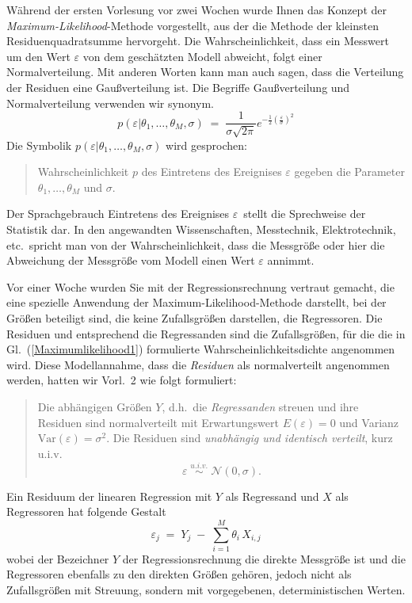 Während der ersten Vorlesung vor zwei Wochen wurde Ihnen das Konzept der
\textsl{Maximum-Likelihood}-Methode vorgestellt, aus
der die Methode der kleinsten Residuenquadratsumme hervorgeht. Die Wahrscheinlichkeit,
dass ein Messwert um den Wert $\varepsilon$ von dem geschätzten Modell abweicht, folgt
einer Normalverteilung. Mit anderen Worten kann man auch sagen, dass
die Verteilung der Residuen eine Gaußverteilung ist.
Die Begriffe Gaußverteilung und Normalverteilung verwenden wir synonym.
\begin{equation}
p(\varepsilon | \theta_1,\dots,\theta_M, \sigma) \; = \; \frac{1}{\sigma \sqrt{2 \pi}}
e^{-\frac{1}{2} \left(\frac{\varepsilon}{\sigma}\right)^2}
\label{Maximumlikelihood1}
\end{equation}
Die Symbolik $p(\varepsilon | \theta_1,\dots,\theta_M, \sigma)$ wird gesprochen:
\begin{quote}
Wahrscheinlichkeit $p$ des Eintretens des Ereignises $\varepsilon$
gegeben die Parameter $\theta_1,\dots,\theta_M$ und $\sigma$.
\end{quote}
Der Sprachgebrauch \glqq Eintretens des Ereignises $\varepsilon$\grqq ~stellt die
Sprechweise der Statistik dar. In den angewandten Wissenschaften, Messtechnik,
Elektrotechnik, etc.\ spricht man von der Wahrscheinlichkeit, dass die Messgröße
oder hier die Abweichung der Messgröße vom Modell einen Wert $\varepsilon$ annimmt.

Vor einer Woche wurden Sie mit der Regressionsrechnung vertraut gemacht, die
eine spezielle Anwendung der Maximum-Likelihood-Methode darstellt, bei der
Größen beteiligt sind, die keine Zufallsgrößen darstellen, die Regressoren.
Die Residuen und entsprechend die Regressanden sind die Zufallsgrößen,
für die die in Gl.~(\ref{Maximumlikelihood1}) formulierte Wahrscheinlichkeitsdichte
angenommen wird.
Diese Modellannahme, dass die \textsl{Residuen} als normalverteilt angenommen werden,
hatten wir Vorl.~2 wie folgt formuliert:
\begin{quote}
Die abhängigen Größen $Y$, d.h.\ die \textsl{Regressanden} streuen und ihre Residuen sind
	normalverteilt mit Erwartungswert $E(\varepsilon) = 0$ und Varianz $\mathrm{Var}(\varepsilon) = \sigma^2$. 
	Die Residuen sind \textsl{unabhängig und identisch verteilt}, kurz u.i.v.
	\begin{equation}
	\varepsilon \; \overset{u.i.v.}{\sim} \; \mathcal{N}(0,\sigma) .
	\label{Resinormalverteilt}
	\end{equation}
\end{quote}
Ein Residuum der linearen Regression mit $Y$ als Regressand und $X$ als Regressoren
hat folgende Gestalt
\begin{equation}
\varepsilon_j \; = \; Y_j \; - \; \sum\limits_{i=1}^{M} \theta_i \, X_{i,j}
\end{equation}
wobei der Bezeichner $Y$ der Regressionsrechnung die direkte Messgröße ist und die
Regressoren ebenfalls zu den direkten Größen gehören, jedoch nicht als Zufallsgrößen mit
Streuung, sondern mit vorgegebenen, deterministischen Werten.

